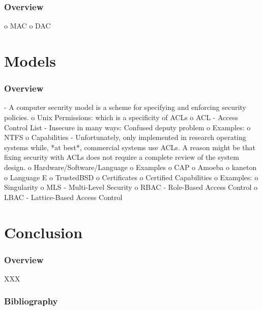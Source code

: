 \begin{frame}
  \frametitle{Overview}

  o MAC
  o DAC
\end{frame}

%
%

\section{Models}


\begin{frame}
  \frametitle{Overview}

  - A computer security model is a scheme for specifying and enforcing security policies.
  o Unix Permissions: which is a specificity of ACLs
  o ACL - Access Control List
    - Insecure in many ways: Confused deputy problem
    o Examples:
      o NTFS
  o Capabilities
    - Unfortunately, only implemented in research operating systems while, *at best*, commercial
      systems use ACLs. A reason might be that fixing security with ACLs does not require
      a complete review of the system design.
    o Hardware/Software/Language
    o Examples
      o CAP
      o Amoeba
      o kaneton
      o Language E
      o TrustedBSD
  o Certificates
    o Certified Capabilities
    o Examples:
      o Singularity
  o MLS - Multi-Level Security
  o RBAC - Role-Based Access Control
  o LBAC - Lattice-Based Access Control
\end{frame}

%
%

\section{Conclusion}


\begin{frame}
  \frametitle{Overview}

  XXX
\end{frame}

%
%

\begin{frame}
  \frametitle{Bibliography}

  
  
\end{frame}


